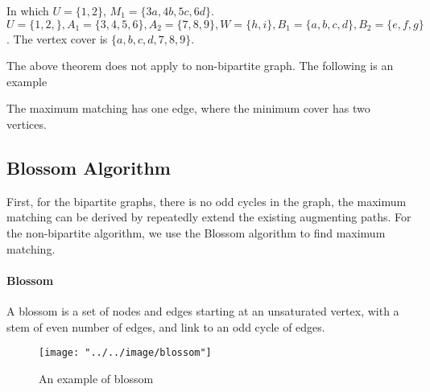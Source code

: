                 In which $U = \{1, 2\}$, $M_1 = \{3a, 4b, 5c, 6d\}$. $U = \{1, 2,\}, A_1 = \{3, 4, 5, 6\}, A_2 = \{7, 8, 9\}, W=\{h, i\}, B_1 = \{a, b, c, d\}, B_2 = \{e, f, g\}$. The vertex cover is $\{a, b, c, d, 7, 8, 9\}$.

                The above theorem does not apply to non-bipartite graph. The following is an example
                \begin{figure}[H]
                    \centering
                \end{figure}

                The maximum matching has one edge, where the minimum cover has two vertices.

            \subsection{Blossom Algorithm}
                First, for the bipartite graphs, there is no odd cycles in the graph, the maximum matching can be derived by repeatedly extend the existing augmenting paths. For the non-bipartite algorithm, we use the Blossom algorithm to find maximum matching.

                \paragraph{Blossom}
                A blossom is a set of nodes and edges starting at an unsaturated vertex, with a stem of even number of edges, and link to an odd cycle of edges. 

                \begin{figure}[H]
                    \centering
                    \texttt{[image: "../../image/blossom"]}
                    \caption{An example of blossom}
                \end{figure}

